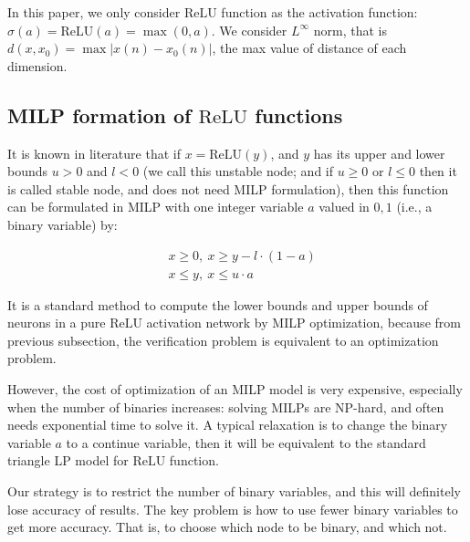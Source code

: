\documentclass[8pt]{article}
\theoremstyle{definition}
\newcommand{\ReLU}{\mathrm{ReLU}}
\begin{document}
In this paper, we only consider $\ReLU$ function as the activation function: $\sigma(a)=\ReLU(a)=\max(0,a)$. We consider $L^{\infty}$ norm, that is $d(x,x_0)=\max |x(n)-x_0(n)|$, the max value of distance of each dimension.



\subsection{MILP formation of $\ReLU$ functions}



It is known in literature that if $x=\ReLU(y)$, and $y$ has its upper and lower bounds $u>0$ and $l<0$ (we call this unstable node; and if $u\geq 0$ or $l\leq 0$ then it is called stable node, and does not need MILP formulation), then this function can be formulated in MILP with one integer variable $a$ valued in ${0,1}$ (i.e., a binary variable) by:

\vspace*{-4ex}

\begin{align*}
	&x \geq 0, \ 
	x \geq y-l\cdot (1-a)\\
	&x \leq y,\ 
	x \leq u\cdot a
\end{align*} 

It is a standard method to compute the lower bounds and upper bounds of neurons in a pure $\ReLU$ activation network by MILP optimization, because from previous subsection, the verification problem is equivalent to an optimization problem.

However, the cost of optimization of an MILP model is very expensive, especially when the number of binaries increases: solving MILPs are NP-hard, and often needs exponential time to solve it. A typical relaxation is to change the binary variable $a$ to a continue variable, then it will be equivalent to the standard triangle LP model for $\ReLU$ function.

Our strategy is to restrict the number of binary variables, and this will definitely lose accuracy of results.  The key problem is how to use fewer binary variables to get more accuracy. That is, to choose which node to be binary, and which not.
\end{document}
